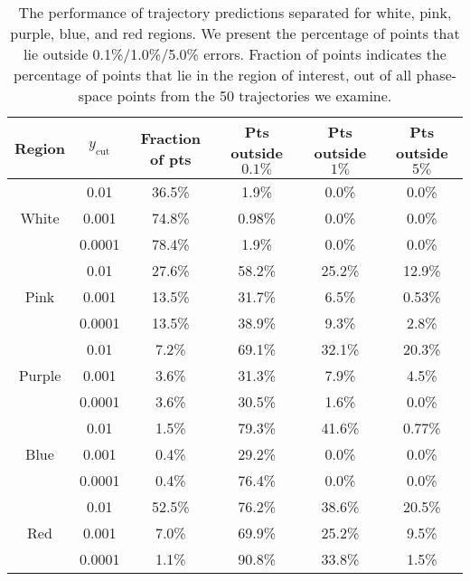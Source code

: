 \documentclass[main.tex]{subfiles}
\begin{document}
\begin{table}
    \centering
    \begin{tabular}{|c|c|c|c|c|c|}
        \hline
        Region & $y_{\mathrm{cut}}$ & Fraction of pts & Pts outside $0.1\%$ & Pts outside $1\%$ & Pts outside $5\%$ \\
        \hline
        \multirow{3}{*}{White} & 0.01   & 36.5\% & 1.9\% & 0.0\% & 0.0\% \\
        \cline{2-6}
                               & 0.001  & 74.8\% & 0.98\% & 0.0\% & 0.0\% \\
        \cline{2-6}
                               & 0.0001 & 78.4\% & 1.9\% & 0.0\%  & 0.0\% \\
        \hline
        \hline
        \multirow{3}{*}{Pink}  & 0.01   & 27.6\% & 58.2\% & 25.2\% & 12.9\% \\
        \cline{2-6}
                               & 0.001  & 13.5\% & 31.7\% & 6.5\% & 0.53\% \\
        \cline{2-6}
                               & 0.0001 & 13.5\% & 38.9\% & 9.3\% & 2.8\% \\
        \hline
        \hline
        \multirow{3}{*}{Purple}& 0.01   & 7.2\% & 69.1\% & 32.1\% & 20.3\% \\
        \cline{2-6}
                               & 0.001  & 3.6\% & 31.3\% & 7.9\% & 4.5\% \\
        \cline{2-6}
                               & 0.0001 & 3.6\% & 30.5\% & 1.6\% & 0.0\% \\
        \hline
        \hline
        \multirow{3}{*}{Blue}  & 0.01   & 1.5\% & 79.3\% & 41.6\% & 0.77\% \\
        \cline{2-6}
                               & 0.001  & 0.4\% & 29.2\% & 0.0\% & 0.0\% \\
        \cline{2-6}
                               & 0.0001 & 0.4\% & 76.4\% & 0.0\% & 0.0\% \\
        \hline
        \hline
        \multirow{3}{*}{Red}   & 0.01   & 52.5\% & 76.2\% & 38.6\% & 20.5\% \\
        \cline{2-6}
                               & 0.001  & 7.0\%  & 69.9\% & 25.2\% & 9.5\% \\
        \cline{2-6}
                               & 0.0001 & 1.1\%  & 90.8\% & 33.8\% & 1.5\% \\
        \hline
    \end{tabular}
    \caption{The performance of trajectory predictions separated for white, pink, purple, blue, and red regions.
    We present the percentage of points that lie outside 0.1\%/1.0\%/5.0\% errors.
    Fraction of points indicates the percentage of points that lie in the region of interest, out of all phase-space points from the 50 trajectories we examine.
    }
    \label{table:trajectory_predictions}
\end{table}
\end{document}
